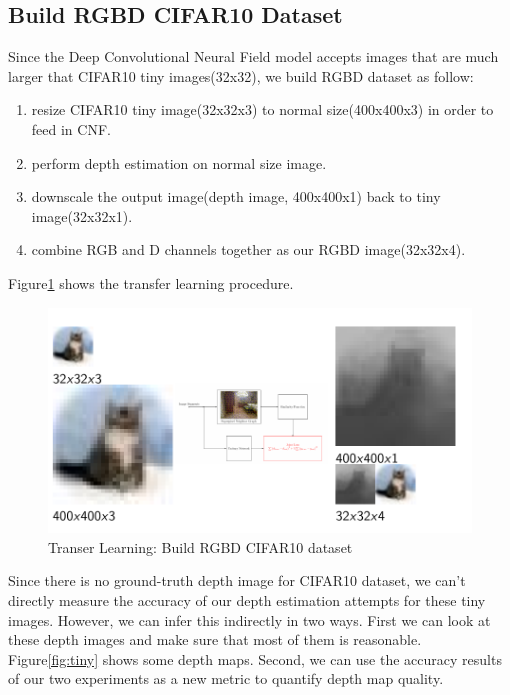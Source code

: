 \documentclass[10pt,twocolumn,letterpaper]{article}
\begin{document}
\subsection{Build RGBD CIFAR10 Dataset}
Since the Deep Convolutional Neural Field model accepts images that are 
much larger that CIFAR10 tiny images(32x32), we build RGBD dataset as follow:
\begin{enumerate}
\item resize CIFAR10 tiny image(32x32x3) to normal size(400x400x3) in order to 
feed in CNF.
\item perform depth estimation on normal size image.
\item downscale the output image(depth image, 400x400x1) back to tiny 
image(32x32x1).
\item combine RGB and D channels together as our RGBD image(32x32x4).
\end{enumerate}
Figure\ref{fig:dataset} shows the transfer learning procedure.
\begin{figure}
\includegraphics[width=\linewidth]{../dataset.png}
\caption{Transer Learning: Build RGBD CIFAR10 dataset}
\label{fig:dataset}
\end{figure}
Since there is no ground-truth depth image for CIFAR10 dataset, we can\rq{}t directly 
measure the accuracy of our depth estimation attempts for these tiny images. 
However, we can infer this indirectly in two ways.
First we can look at these depth images
and make sure that most of them is reasonable.
Figure\ref{fig:tiny} shows some depth maps.
Second, we can use the accuracy results of our two experiments as a new metric to 
quantify depth map quality.
\end{document}
